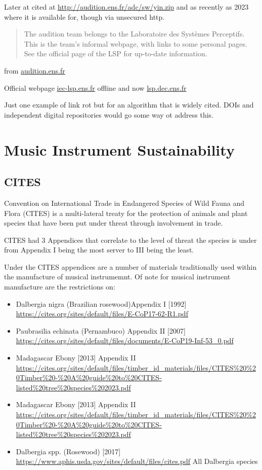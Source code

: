 Later at cited at \url{http://audition.ens.fr/adc/sw/yin.zip} and as recently as 2023 \cite{alain_cancellation_2023} where it is available for, though via unsecured http.

\begin{quote}
The audition team belongs to the Laboratoire des Systèmes Perceptifs. This is the team's informal webpage, with links to some personal pages. See the official page of the LSP for up-to-date information.
\end{quote} from \url{audition.ens.fr}

Official webpage \url{iec-lsp.ens.fr} offline and now \url{lsp.dec.ens.fr}

Just one example of link rot but for an algorithm that is widely cited. DOIs and independent digital repositories would go some way ot address this.


\section{Music Instrument Sustainability}
\subsection{CITES}

Convention on International Trade in Endangered Species of Wild Fauna and Flora (CITES) is a multi-lateral treaty for the protection of animals and plant species that have been put under threat through involvement in trade.

CITES had 3 Appendices that correlate to the level of threat the species is under from Appendix I being the most server to III being the least.

Under the CITES appendices are a number of materials traditionally used within the manufacture of musical instrumemnt. Of note for musical instrument manufacture are the restrictions on:

\begin{itemize}
    \item Dalbergia nigra (Brazilian rosewood)Appendix I  [1992] \url{https://cites.org/sites/default/files/E-CoP17-62-R1.pdf}
    \item Paubrasilia echinata (Pernambuco) Appendix II  [2007] \url{https://cites.org/sites/default/files/documents/E-CoP19-Inf-53_0.pdf}
    \item Madagascar Ebony [2013] Appendix II \url{https://cites.org/sites/default/files/timber_id_materials/files/CITES%20%20Timber%20-%20A%20guide%20to%20CITES-listed%20tree%20species%202023.pdf}
    \item Madagascar Ebony [2013] Appendix II \url{https://cites.org/sites/default/files/timber_id_materials/files/CITES%20%20Timber%20-%20A%20guide%20to%20CITES-listed%20tree%20species%202023.pdf}
    \item Dalbergia spp. (Rosewood) [2017] \url{https://www.aphis.usda.gov/sites/default/files/cites.pdf} All Dalbergia species
\end{itemize}


